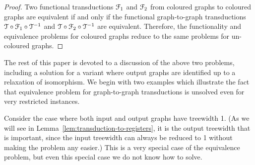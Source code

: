 \begin{proof}
    Two functional \mso transductions ${\mathcal F}_1$ and ${\mathcal F}_2$  from coloured graphs to coloured graphs are equivalent if and only if the functional graph-to-graph \mso transductions  ${\mathcal T} \circ {\mathcal F}_1 \circ {\mathcal T}^{-1}$ and ${\mathcal T} \circ {\mathcal F}_2 \circ {\mathcal T}^{-1}$ are equivalent. 
     Therefore, the functionality and equivalence problems for coloured graphs reduce to the same problems for un-coloured graphs.
\end{proof}

The rest of this paper is devoted to a discussion of the above two problems, including a solution for a variant where output graphs are identified up to a relaxation of isomorphism.
We begin with two examples which illustrate the fact that equivalence problem for graph-to-graph transductions is unsolved even for very restricted instances.

    Consider the
    case
    where both input and output graphs have treewidth 1. (As we will see in Lemma~\ref{lem:transduction-to-registers}, it is the output treewidth that is important, since the input treewidth can always be reduced to 1 without making the problem any easier.)
    This is a very special case of the equivalence problem, but even this special case we do not know how to solve.
    
